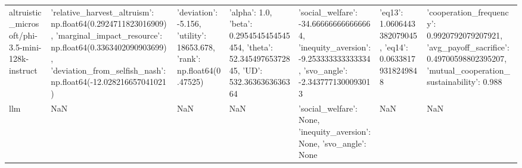 \begin{table}
\begin{tabular}{lllllll}
altruistic_microsoft/phi-3.5-mini-128k-instruct & {'relative_harvest_altruism': np.float64(0.2924711823016909), 'marginal_impact_resource': np.float64(0.3363402090903699), 'deviation_from_selfish_nash': np.float64(-12.028216657041021)} & {'deviation': -5.156, 'utility': 18653.678, 'rank': np.float64(0.47525)} & {'alpha': 1.0, 'beta': 0.2954545454545454, 'theta': 52.34549765372845, 'UD': 532.3636363636364} & {'social_welfare': -34.666666666666664, 'inequity_aversion': -9.253333333333334, 'svo_angle': -2.3437771300093013} & {'eq13': 1.0606443382079045, 'eq14': 0.06338179318249848} & {'cooperation_frequency': 0.9920792079207921, 'avg_payoff_sacrifice': 0.49700598802395207, 'mutual_cooperation_sustainability': 0.988} \\
llm & NaN & NaN & NaN & {'social_welfare': None, 'inequity_aversion': None, 'svo_angle': None} & NaN & NaN \\
\bottomrule
\end{tabular}
\end{table}
